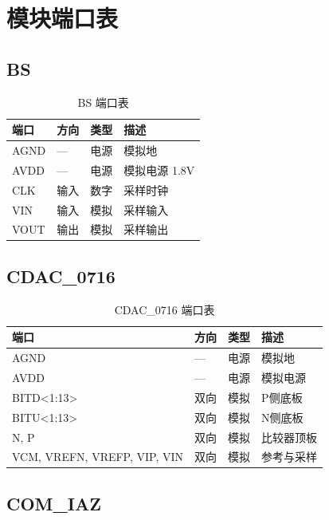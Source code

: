 \documentclass[UTF8,a4paper,11pt]{ctexart}
\begin{document}
\section{模块端口表}
\label{app:module-ports}

\subsection{BS}

\begin{table}[H]
\centering
\caption{BS 端口表}
\label{tab:app-bs-ports}
\begin{tabular}{llll}
\toprule
端口 & 方向 & 类型 & 描述 \\
\midrule
AGND  & --- & 电源 & 模拟地 \\
AVDD  & --- & 电源 & 模拟电源 1.8V \\
CLK   & 输入 & 数字 & 采样时钟 \\
VIN   & 输入 & 模拟 & 采样输入 \\
VOUT  & 输出 & 模拟 & 采样输出 \\
\bottomrule
\end{tabular}
\end{table}

\subsection{CDAC\_0716}

\begin{table}[H]
\centering
\caption{CDAC\_0716 端口表}
\label{tab:app-cdac-ports}
\begin{tabular}{llll}
\toprule
端口 & 方向 & 类型 & 描述 \\
\midrule
AGND              & --- & 电源 & 模拟地 \\
AVDD              & --- & 电源 & 模拟电源 \\
BITD<1:13>        & 双向 & 模拟 & P侧底板 \\
BITU<1:13>        & 双向 & 模拟 & N侧底板 \\
N, P              & 双向 & 模拟 & 比较器顶板 \\
VCM, VREFN, VREFP, VIP, VIN & 双向 & 模拟 & 参考与采样 \\
\bottomrule
\end{tabular}
\end{table}

\subsection{COM\_IAZ}
\end{document}
